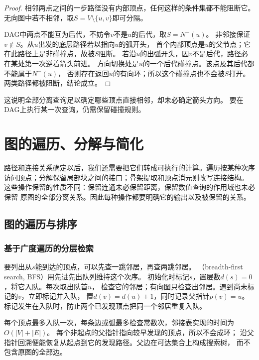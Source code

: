 \begin{proof}
相邻两点之间的一步路径没有内部顶点，任何这样的条件集都不能阻断它。
无向图中若不相邻，取\(S=V\setminus\{u,v\}\)即可分隔。

DAG中两点不能互为后代，不妨令\(v\)不是\(u\)的后代，取\(S=N^-(u)\)。
非邻接保证\(v\notin S\)。从\(u\)出发的底层路径若以指向\(u\)的弧开头，
首个内部顶点是\(u\)的父节点；它在此路径上是非碰撞点，故被\(S\)阻断。
若沿\(u\)的出弧开头，因\(v\)不是后代，路径必在某处第一次逆着箭头前进。
方向切换处是\(u\)的一个后代碰撞点。该点及其后代都不能属于\(N^-(u)\)，
否则存在返回\(u\)的有向环；所以这个碰撞点也不会被\(S\)打开。
两类路径都被阻断，结论成立。
\end{proof}

这说明全部分离查询足以确定哪些顶点直接相邻，却未必确定箭头方向。
要在DAG上执行某一次查询，仍需保留碰撞规则。

\section{图的遍历、分解与简化}
\label{sec:graph-theory-traversal-separation-decomposition}

路径和连接关系确定以后，我们还需要把它们转成可执行的计算。遍历按某种次序
访问顶点；分解保留局部块之间的接口；骨架提取和顶点消元则改写连接结构。
这些操作保留的性质不同：保留连通未必保留距离，保留数值查询的作用域也未必保留
原图的全部分离关系。因此每种操作都要明确它的输出以及被保留的关系。

\subsection{图的遍历与排序}

\subsubsection{基于广度遍历的分层检索}
\label{sec:graph-theory-bfs}

要列出从\(s\)能到达的顶点，可以先查一跳邻居，再查两跳邻居。
（breadth-first search, BFS）用先进先出队列维持这个次序。
初始化时标记\(s\)，置层数\(d(s)=0\)，将它入队。每次取出队首\(u\)，
检查它的邻居；有向图只检查出邻居。遇到尚未标记的\(v\)，立即标记并入队，
置\(d(v)=d(u)+1\)，同时记录父指针\(p(v)=u\)。
标记发生在入队时，防止两个已发现顶点把同一个邻居重复入队。

每个顶点最多入队一次，每条边或弧最多检查常数次，邻接表实现的时间为
\(O(|V|+|E|)\)。
每个非起点的父指针指向较早发现的顶点，所以不会成环；
沿父指针回溯便能恢复从起点到它的发现路径。父边在可达集合上构成搜索树，
而不包含原图的全部边。

